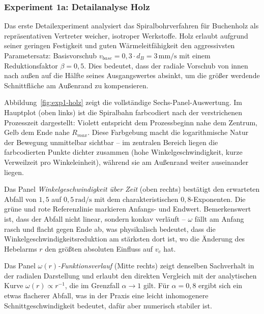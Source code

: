 ﻿\documentclass[12pt,a4paper]{article}
\begin{document}
\subsubsection{Experiment 1a: Detailanalyse Holz}

Das erste Detailexperiment analysiert das Spiralbohrverfahren für Buchenholz als repräsentativen Vertreter weicher, isotroper Werkstoffe. Holz erlaubt aufgrund seiner geringen Festigkeit und guten Wärmeleitfähigkeit den aggressivsten Parametersatz: Basisvorschub $v_{base} = 0{,}3 \cdot d_B = 3\,\text{mm/s}$ mit einem Reduktionsfaktor $\beta = 0{,}5$. Dies bedeutet, dass der radiale Vorschub von innen nach außen auf die Hälfte seines Ausgangswertes absinkt, um die größer werdende Schnittfläche am Außenrand zu kompensieren.

Abbildung~\ref{fig:exp1-holz} zeigt die vollständige Sechs-Panel-Auswertung. Im Hauptplot (oben links) ist die Spiralbahn farbcodiert nach der verstrichenen Prozesszeit dargestellt: Violett entspricht dem Prozessbeginn nahe dem Zentrum, Gelb dem Ende nahe $R_{max}$. Diese Farbgebung macht die logarithmische Natur der Bewegung unmittelbar sichtbar -- im zentralen Bereich liegen die farbcodierten Punkte dichter zusammen (hohe Winkelgeschwindigkeit, kurze Verweilzeit pro Winkeleinheit), während sie am Außenrand weiter auseinander liegen.

Das Panel \textit{Winkelgeschwindigkeit über Zeit} (oben rechts) bestätigt den erwarteten Abfall von $1{,}5$ auf $0{,}5\,\text{rad/s}$ mit dem charakteristischen $0{,}8$-Exponenten. Die grüne und rote Referenzlinie markieren Anfangs- und Endwert. Bemerkenswert ist, dass der Abfall nicht linear, sondern konkav verläuft -- $\omega$ fällt am Anfang rasch und flacht gegen Ende ab, was physikalisch bedeutet, dass die Winkelgeschwindigkeitsreduktion am stärksten dort ist, wo die Änderung des Hebelarms $r$ den größten absoluten Einfluss auf $v_c$ hat.

Das Panel \textit{$\omega(r)$-Funktionsverlauf} (Mitte rechts) zeigt denselben Sachverhalt in der radialen Darstellung und erlaubt den direkten Vergleich mit der analytischen Kurve $\omega(r) \propto r^{-1}$, die im Grenzfall $\alpha \to 1$ gilt. Für $\alpha = 0{,}8$ ergibt sich ein etwas flacherer Abfall, was in der Praxis eine leicht inhomogenere Schnittgeschwindigkeit bedeutet, dafür aber numerisch stabiler ist.
\end{document}
